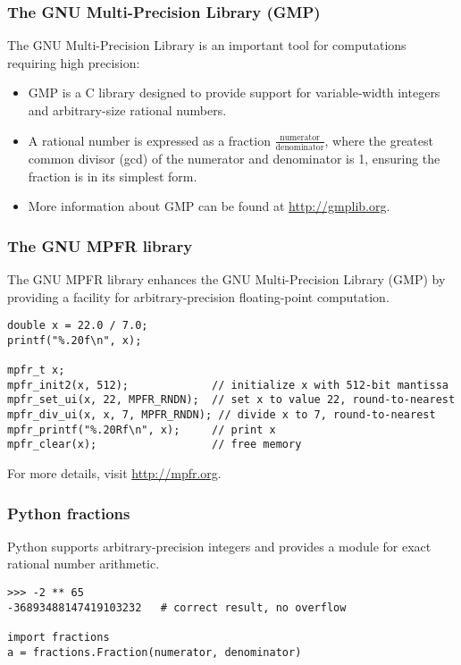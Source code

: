 \documentclass[12pt]{article}
\begin{document}
\subsubsection{The GNU Multi-Precision Library (GMP)}
The GNU Multi-Precision Library is an important tool for computations requiring high precision:

\begin{itemize}
    \item GMP is a C library designed to provide support for variable-width integers and arbitrary-size rational numbers.
    \item A rational number is expressed as a fraction \( \frac{\text{numerator}}{\text{denominator}} \), where the greatest common divisor (gcd) of the numerator and denominator is 1, ensuring the fraction is in its simplest form.
    \item More information about GMP can be found at \url{http://gmplib.org}.
\end{itemize}


\subsubsection{The GNU MPFR library}
The GNU MPFR library enhances the GNU Multi-Precision Library (GMP) by providing a facility for arbitrary-precision floating-point computation.

\begin{lstlisting}
double x = 22.0 / 7.0;
printf("%.20f\n", x);

mpfr_t x;
mpfr_init2(x, 512);             // initialize x with 512-bit mantissa
mpfr_set_ui(x, 22, MPFR_RNDN);  // set x to value 22, round-to-nearest
mpfr_div_ui(x, x, 7, MPFR_RNDN); // divide x to 7, round-to-nearest
mpfr_printf("%.20Rf\n", x);     // print x
mpfr_clear(x);                  // free memory
\end{lstlisting}

For more details, visit \url{http://mpfr.org}.

\subsubsection{Python fractions}
Python supports arbitrary-precision integers and provides a module for exact rational number arithmetic.

\begin{lstlisting}
>>> -2 ** 65
-36893488147419103232   # correct result, no overflow

import fractions
a = fractions.Fraction(numerator, denominator)
\end{lstlisting}
\end{document}
